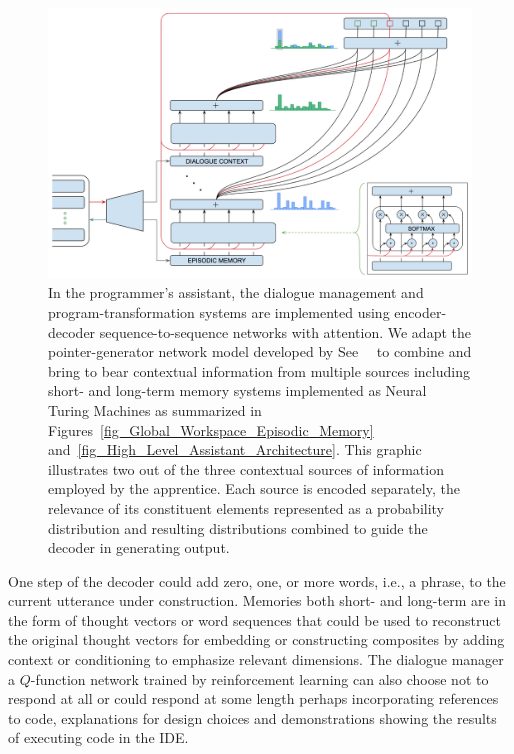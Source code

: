 
\begin{figure}
%
  \begin{center} 
    \includegraphics[width=475pt]{./figures/Context_Episodic_Memory_Dialog.png} %
  \end{center}
%
  \caption{In the programmer's assistant, the dialogue management and program-transformation systems are implemented using encoder-decoder sequence-to-sequence networks with attention. We adapt the pointer-generator network model developed by See~\etal{}~\cite{SeeetalACL-17} to combine and bring to bear contextual information from multiple sources including short- and long-term memory systems implemented as Neural Turing Machines as summarized in Figures~\ref{fig_Global_Workspace_Episodic_Memory} and~\ref{fig_High_Level_Assistant_Architecture}. This graphic illustrates two out of the three contextual sources of information employed by the apprentice. Each source is encoded separately, the relevance of its constituent elements represented as a probability distribution and resulting distributions combined to guide the decoder in generating output.}
%
  \label{Context_Episodic_Memory_Dialog}
%
\end{figure}


One step of the decoder could add zero, one, or more words, i.e., a phrase, to the current utterance under construction. Memories \emdash{} both short- and long-term \emdash{} are in the form of thought vectors or word sequences that could be used to reconstruct the original thought vectors for embedding or constructing composites by adding context or conditioning to emphasize relevant dimensions. The dialogue manager \emdash{} a $Q$-function network trained by reinforcement learning \emdash{} can also choose not to respond at all or could respond at some length perhaps incorporating references to code, explanations for design choices and demonstrations showing the results of executing code in the IDE.

